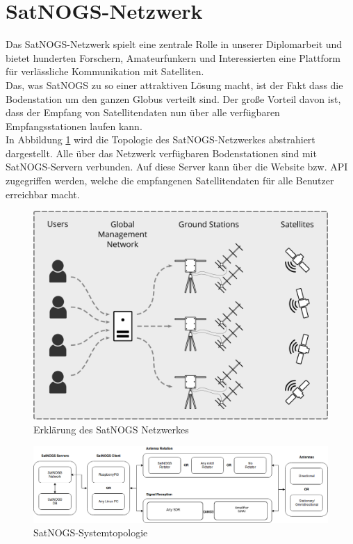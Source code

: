 \section{SatNOGS-Netzwerk}
\label{sec:sat}
Das SatNOGS-Netzwerk spielt eine zentrale Rolle in unserer Diplomarbeit und bietet hunderten Forschern, Amateurfunkern und Interessierten eine Plattform für verlässliche Kommunikation mit Satelliten.\\

Das, was SatNOGS zu so einer attraktiven Lösung macht, ist der Fakt dass die Bodenstation um den ganzen Globus verteilt sind. Der große Vorteil davon ist, dass der Empfang von Satellitendaten nun über alle verfügbaren Empfangsstationen laufen kann.\\

In Abbildung \ref{fig:SatNOGS_Erklärung} wird die Topologie des SatNOGS-Netzwerkes abstrahiert dargestellt.
Alle über das Netzwerk verfügbaren Bodenstationen sind mit SatNOGS-Servern verbunden. Auf diese Server kann über die Website bzw. API zugegriffen werden, welche die empfangenen Satellitendaten für alle Benutzer erreichbar macht.

\begin{figure}[H]
	\centering
	\includegraphics[width=\textwidth]{../ref/SatNOGS_explanation}
	\caption{Erklärung des SatNOGS Netzwerkes}
	\label{fig:SatNOGS_Erklärung}
\end{figure}	

\begin{figure}[H]
	\centering
	\includegraphics[width=\textwidth]{../ref/SatNOGS_BlockDiagram}
	\caption{SatNOGS-Systemtopologie}
	\label{fig:SatNOGS_Systemtopologie}
\end{figure}


